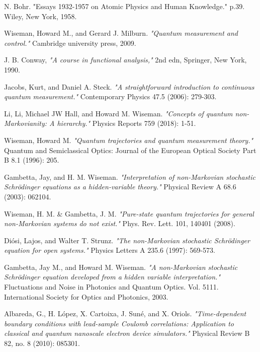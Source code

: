 \documentclass[11pt, a4paper]{article} %
\begin{document}
\begin{thebibliography}{1}
{
N. Bohr. {"Essays 1932-1957 on Atomic Physics and Human Knowledge."} p.39. Wiley, New York, 1958.


Wiseman, Howard M., and Gerard J. Milburn. {\em "Quantum measurement and control."} Cambridge university press, 2009.

J. B. Conway, {\em "A course in functional analysis,"} 2nd edn, Springer, New York, 1990.

Jacobs, Kurt, and Daniel A. Steck. {\em "A straightforward introduction to continuous quantum measurement."} Contemporary Physics 47.5 (2006): 279-303.

Li, Li, Michael JW Hall, and Howard M. Wiseman. {\em "Concepts of quantum non-Markovianity: A hierarchy."} Physics Reports 759 (2018): 1-51.

Wiseman, Howard M. {\em "Quantum trajectories and quantum measurement theory."} Quantum and Semiclassical Optics: Journal of the European Optical Society Part B 8.1 (1996): 205.

Gambetta, Jay, and H. M. Wiseman. {\em "Interpretation of non-Markovian stochastic Schrödinger equations as a hidden-variable theory."} Physical Review A 68.6 (2003): 062104.

Wiseman, H. M. \& Gambetta, J. M. {\em "Pure-state quantum trajectories for general non-Markovian systems do not exist."} Phys. Rev. Lett. 101, 140401 (2008).

Diósi, Lajos, and Walter T. Strunz. {\em "The non-Markovian stochastic Schrödinger equation for open systems."} Physics Letters A 235.6 (1997): 569-573.

Gambetta, Jay M., and Howard M. Wiseman. {\em "A non-Markovian stochastic Schrödinger equation developed from a hidden variable interpretation."} Fluctuations and Noise in Photonics and Quantum Optics. Vol. 5111. International Society for Optics and Photonics, 2003.

Albareda, G., H. López, X. Cartoixa, J. Suné, and X. Oriols. {\em "Time-dependent boundary conditions with lead-sample Coulomb correlations: Application to classical and quantum nanoscale electron device simulators."} Physical Review B 82, no. 8 (2010): 085301.

}
\end{thebibliography}
\end{document}
